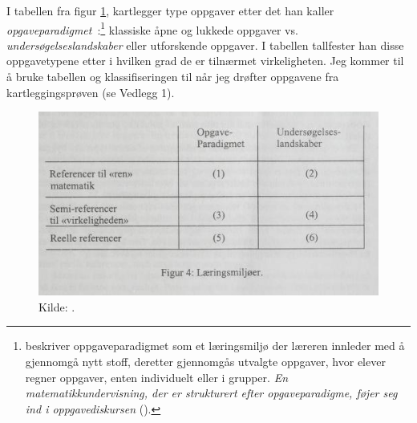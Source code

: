 \documentclass[main.tex]{subfiles}
\begin{document}
I tabellen fra figur \ref{fig:skov98}, kartlegger  type oppgaver etter det han kaller 
\mbox{\emph{opgaveparadigmet} :}\footnote[2]{ beskriver oppgaveparadigmet som et læringsmiljø der læreren 
innleder med å gjennomgå nytt stoff, deretter gjennomgås utvalgte oppgaver, hvor elever regner oppgaver, enten 
individuelt eller i grupper. \emph{En matematikkundervisning, der er strukturert efter opgaveparadigme, føjer seg ind i 
\guillemotleft oppgavediskursen\guillemotright} ().} klassiske åpne og lukkede oppgaver vs. 
\emph{undersøgelseslandskaber} eller utforskende oppgaver. I tabellen tallfester han disse oppgavetypene etter i hvilken 
grad de er tilnærmet virkeligheten. Jeg kommer til å bruke tabellen og klassifiseringen til  når 
jeg drøfter oppgavene fra kartleggingsprøven (se Vedlegg 1). 

\begin{figure}[h!]
\centering
\includegraphics[scale = 0.7]{../figures/laeringsmiljoer.png}
\caption{Kilde: \protect{}.}
\label{fig:skov98}
\end{figure}
\end{document}
